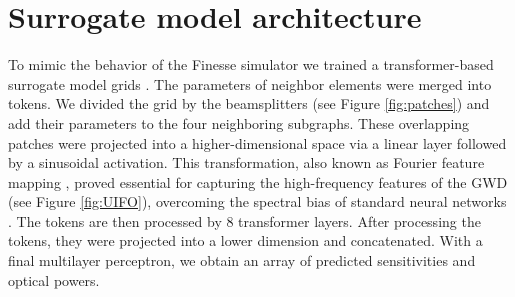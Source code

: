 \documentclass[a4paper,twocolumn,11pt,unpublished]{quantumarticle}
\begin{document}
\section{Surrogate model architecture}\label{app:architecture}

To mimic the behavior of the Finesse simulator we trained a transformer-based surrogate model grids \cite{mixers4images,mixers4graphs}. The parameters of neighbor elements were merged into tokens. We divided the grid by the beamsplitters (see Figure \ref{fig:patches}) and add their parameters to the four neighboring subgraphs. These overlapping patches were projected into a higher-dimensional space via a linear layer followed by a sinusoidal activation. This transformation, also known as Fourier feature mapping \cite{fourierfeatures}, proved essential for capturing the high-frequency features of the GWD (see Figure \ref{fig:UIFO}), overcoming the spectral bias of standard neural networks \cite{frequencybias,spectralbias}. The tokens are then processed by 8 transformer layers. After processing the tokens, they were projected into a lower dimension and concatenated. With a final multilayer perceptron, we obtain an array of predicted sensitivities and optical powers.
\end{document}
